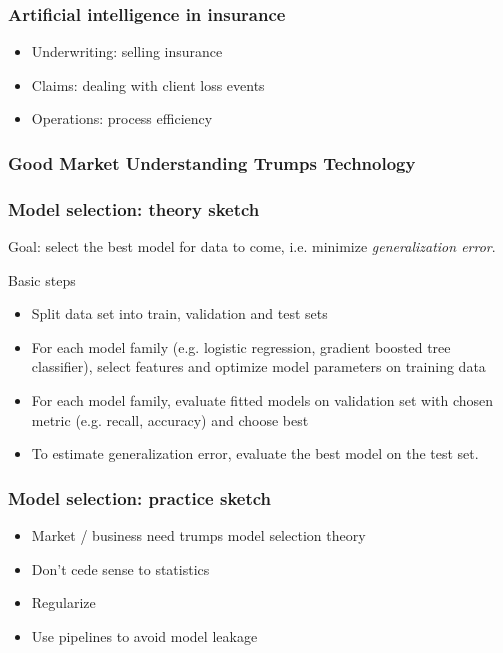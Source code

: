 \begin{frame}
  \frametitle{Artificial intelligence in insurance}

  \begin{itemize}
    \item Underwriting: selling insurance
    \item Claims: dealing with client loss events
    \item Operations: process efficiency
  \end{itemize}
\end{frame}

\begin{frame}
\frametitle{Good Market Understanding Trumps Technology}
\centering
{}
\end{frame}

\begin{frame}
  \frametitle{Model selection: theory sketch}
  Goal: select the best model for data to come, i.e. minimize \emph{generalization error}.\newline

  Basic steps
  \begin{itemize}
    \item {\color{blue}Split data} set into train, validation and test sets
    \item For each model family (e.g. logistic regression, gradient boosted tree classifier), {\color{blue}select features} and {\color{blue}optimize model parameters} on training data
    \item For each model family, {\color{blue}evaluate fitted models} on validation set with chosen metric (e.g. recall, accuracy) and choose best
    \item To {\color{blue}estimate generalization error}, evaluate the best model on the test set.
  \end{itemize}
\end{frame}
\begin{frame}
  \frametitle{Model selection: practice sketch}

  \begin{itemize}
    \item Market / business need trumps model selection theory
    \item Don't cede sense to statistics
    \item Regularize
    \item Use pipelines to avoid model leakage
  \end{itemize}
\end{frame}


